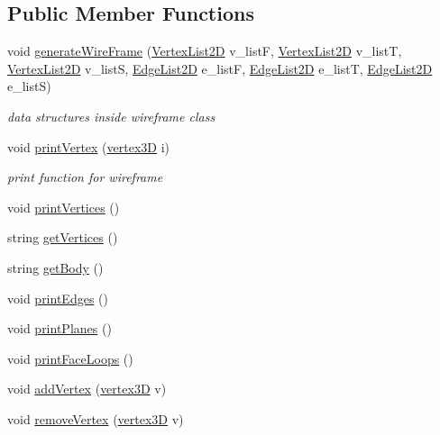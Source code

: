 \subsection*{Public Member Functions}
\begin{DoxyCompactItemize}
\item 
void \mbox{\hyperlink{classwire_frame_ad31eeecbba164e703cd67ea11c13df51}{generate\+Wire\+Frame}} (\mbox{\hyperlink{class_vertex_list2_d}{Vertex\+List2D}} v\+\_\+listF, \mbox{\hyperlink{class_vertex_list2_d}{Vertex\+List2D}} v\+\_\+listT, \mbox{\hyperlink{class_vertex_list2_d}{Vertex\+List2D}} v\+\_\+listS, \mbox{\hyperlink{class_edge_list2_d}{Edge\+List2D}} e\+\_\+listF, \mbox{\hyperlink{class_edge_list2_d}{Edge\+List2D}} e\+\_\+listT, \mbox{\hyperlink{class_edge_list2_d}{Edge\+List2D}} e\+\_\+listS)
\begin{DoxyCompactList}\small\item\em data structures inside wireframe class \end{DoxyCompactList}\item 
void \mbox{\hyperlink{classwire_frame_a34148f5947e3d44f74650bb88c532905}{print\+Vertex}} (\mbox{\hyperlink{structvertex3_d}{vertex3D}} i)
\begin{DoxyCompactList}\small\item\em print function for wireframe \end{DoxyCompactList}\item 
void \mbox{\hyperlink{classwire_frame_a1f30c3a4320bb7016abedab3a1cf18d5}{print\+Vertices}} ()
\item 
string \mbox{\hyperlink{classwire_frame_aa90f66614bc9fe0616cc433d593f0241}{get\+Vertices}} ()
\item 
string \mbox{\hyperlink{classwire_frame_adafc56f2ed107ea6d8449da17cc9f39b}{get\+Body}} ()
\item 
void \mbox{\hyperlink{classwire_frame_a0d08d6195d840341525651ec6d598408}{print\+Edges}} ()
\item 
void \mbox{\hyperlink{classwire_frame_a1241bc0d6c1edf1d3ddb5fa8440b8bcb}{print\+Planes}} ()
\item 
void \mbox{\hyperlink{classwire_frame_a7c89bdfbf8e94eb33f90d6057f785cd9}{print\+Face\+Loops}} ()
\item 
void \mbox{\hyperlink{classwire_frame_ae4675da9bff33c6b78b9c0036f6f5b0e}{add\+Vertex}} (\mbox{\hyperlink{structvertex3_d}{vertex3D}} v)
\item 
void \mbox{\hyperlink{classwire_frame_a8b4634def9827d37ae165dbeec1363e7}{remove\+Vertex}} (\mbox{\hyperlink{structvertex3_d}{vertex3D}} v)

\end{DoxyCompactItemize}
